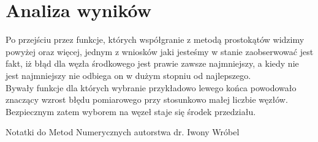 \documentclass[12pt]{article}
\begin{document}
\newpage
\section{Analiza wyników}

Po przejściu przez funkcje, których współgranie z metodą prostokątów widzimy powyżej oraz więcej, jednym z wniosków jaki jesteśmy w stanie zaobserwować jest fakt, iż błąd dla węzła środkowego jest prawie zawsze najmniejszy, a kiedy nie jest najmniejszy nie odbiega on w dużym stopniu od najlepszego. 
\\ 

\noindent Bywały funkcje dla których wybranie przykładowo lewego końca powodowało znaczący wzrost błędu pomiarowego przy stosunkowo małej liczbie węzłów.
\\ 

\noindent Bezpiecznym zatem wyborem na węzeł staje się środek przedziału.

{\small
\begin{thebibliography}{11}

\bibitem{} {Notatki do Metod Numerycznych autorstwa dr. Iwony Wróbel}

\end{thebibliography}
}
\end{document}
